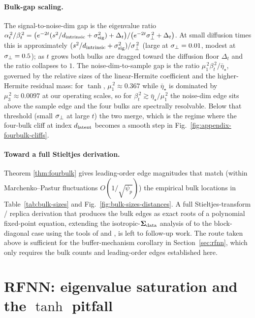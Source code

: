 \paragraph{Bulk-gap scaling.}
The signal-to-noise-dim gap is the eigenvalue ratio
$\alpha_t^{\,2}/\beta_t^{\,2}
 = \bigl(e^{-2t}(s^2/d_{\mathrm{intrinsic}}+\sigma_{\mathrm{sig}}^2)+\Delta_t\bigr)/\bigl(e^{-2t}\sigma_{\perp}^{\,2}+\Delta_t\bigr)$.
At small diffusion times this is approximately
$(s^2/d_{\mathrm{intrinsic}}+\sigma_{\mathrm{sig}}^2)/\sigma_{\perp}^{\,2}$ (large at $\sigma_{\perp}=0.01$,
modest at $\sigma_{\perp}=0.5$); as $t$ grows both bulks are dragged
toward the diffusion floor $\Delta_t$ and the ratio collapses to $1$.
The noise-dim-to-sample gap is the ratio
$\mu_1^{\,2}\beta_t^{\,2}/\bar\eta_\star$, governed by the relative
sizes of the linear-Hermite coefficient and the higher-Hermite
residual mass: for $\tanh$, $\mu_1^{\,2} \approx 0.367$ while
$\bar\eta_\star$ is dominated by $\mu_3^{\,2} \approx 0.0097$ at our
operating scales, so for $\beta_t^{\,2} \gtrsim \bar\eta_\star/\mu_1^{\,2}$
the noise-dim edge sits above the sample edge and the four bulks
are spectrally resolvable. Below that threshold (small $\sigma_{\perp}$ at
large $t$) the two merge, which is the regime where the four-bulk
cliff at index $d_{\mathrm{latent}}$ becomes a smooth step in
Fig.~\ref{fig:appendix-fourbulk-cliffs}.

\paragraph{Toward a full Stieltjes derivation.}
Theorem \ref{thm:fourbulk} gives leading-order edge magnitudes that
match (within Marchenko--Pastur fluctuations $O(1/\sqrt{\psi_p})$)
the empirical bulk locations in Table~\ref{tab:bulk-sizes} and
Fig.~\ref{fig:bulk-sizes-distances}. A full Stieltjes-transform /
replica derivation that produces the bulk edges as exact roots of a
polynomial fixed-point equation, extending the isotropic-$\bm{\Sigma}_{\mathrm{data}}$
analysis of \citet{bonnaire2025} to the block-diagonal case using the
tools of \citet{ELKaroui2010spectrum} and
\citet{benigni2021eigenvalue}, is left to follow-up work. The route
taken above is sufficient for the buffer-mechanism corollary in
Section~\ref{sec:rfnn}, which only requires the bulk counts and
leading-order edges established here.


\section{RFNN: eigenvalue saturation and the $\tanh$ pitfall}
\label{app:saturation}

